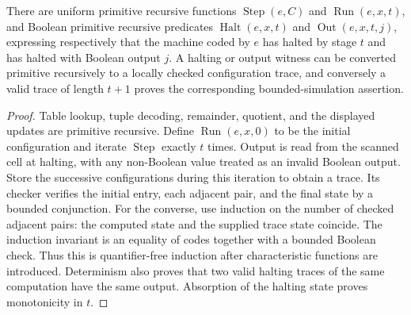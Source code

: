 \begin{lemma}\label{eff:simulation}
There are uniform primitive recursive functions
$\operatorname{Step}(e,C)$ and $\operatorname{Run}(e,x,t)$, and Boolean
primitive recursive predicates
$\operatorname{Halt}(e,x,t)$ and $\operatorname{Out}(e,x,t,j)$,
expressing respectively that the machine coded by $e$ has halted by stage $t$
and has halted with Boolean output $j$.  A halting or output witness can be
converted primitive recursively to a locally checked configuration trace,
and conversely a valid trace of length $t+1$ proves the corresponding
bounded-simulation assertion.
\end{lemma}
\begin{proof}
Table lookup, tuple decoding, remainder, quotient, and the displayed updates
are primitive recursive.  Define $\operatorname{Run}(e,x,0)$ to be the initial
configuration and iterate $\operatorname{Step}$ exactly $t$ times.  Output is
read from the scanned cell at halting, with any non-Boolean value treated
as an invalid Boolean output.  Store the successive configurations during
this iteration to obtain a trace.  Its checker verifies the initial entry,
each adjacent pair, and the final state by a bounded conjunction.
For the converse, use induction on the number of checked adjacent pairs:
the computed state and the supplied trace state coincide.  The induction
invariant is an equality of codes together with a bounded Boolean check.
Thus this is quantifier-free induction after characteristic functions are
introduced.  Determinism also proves that two valid halting traces of the
same computation have the same output.  Absorption of the halting state
proves monotonicity in $t$.
\end{proof}

